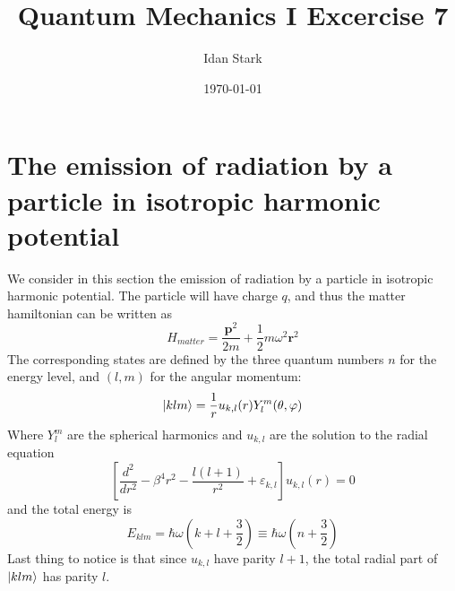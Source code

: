 \documentclass{article}
\title{Quantum Mechanics I Excercise 7}
\author{Idan Stark}
\date{\today}
\begin{document}
\maketitle

\section{The emission of radiation by a particle in isotropic harmonic potential}
We consider in this section the emission of radiation by a particle in isotropic harmonic potential. The particle will have charge $q$, and thus the matter hamiltonian can be written as
\begin{equation}
    H_{matter} = \frac{\boldsymbol{p}^2}{2m} + \frac{1}{2}m\omega^2\boldsymbol{r}^2
\end{equation}
The corresponding states are defined by the three quantum numbers $n$ for the energy level, and $(l, m)$ for the angular momentum:
\begin{equation}
    \ket{klm} = \frac{1}{r}u_{k, l}(r) Y^{m}_l(\theta, \varphi)
\end{equation}
Where $Y^{m}_l$ are the spherical harmonics and $u_{k,l}$ are the solution to the radial equation
\begin{equation}
    \left[\frac{d^2}{dr^2} - \beta^4r^2 - \frac{l(l+1)}{r^2} + \varepsilon_{k, l}\right]u_{k,l}(r) = 0
\end{equation}
and the total energy is
\begin{equation}
    E_{klm} = \hbar \omega \left(k + l +\frac{3}{2}\right) \equiv \hbar \omega \left(n + \frac{3}{2} \right)
\end{equation}
Last thing to notice is that since $u_{k,l}$ have parity $l+1$, the total radial part of $\ket{klm}$ has parity $l$.
\end{document}
